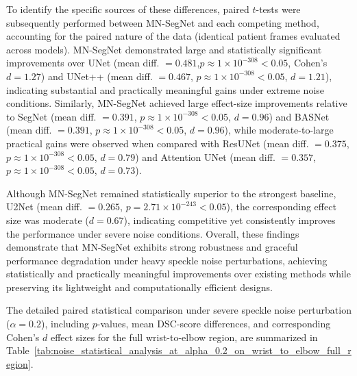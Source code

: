 \documentclass[12pt,letterpaper]{article}
\begin{document}
To identify the specific sources of these differences, paired $t$-tests were
subsequently performed between MN-SegNet and each competing method, accounting
for the paired nature of the data (identical patient frames evaluated across
models). MN-SegNet demonstrated large and statistically significant improvements
over UNet (mean diff. $= 0.481$,$p \approx 1 \times 10^{-308} < 0.05$, Cohen’s $d = 1.27$)
and UNet++ (mean diff. $= 0.467$, $p \approx 1 \times 10^{-308} < 0.05$, $d = 1.21$),
indicating substantial and practically meaningful gains under extreme noise
conditions. Similarly, MN-SegNet achieved large effect-size improvements relative
to SegNet (mean diff. $= 0.391$, $p \approx 1 \times 10^{-308} < 0.05$, $d = 0.96$) and
BASNet (mean diff. $= 0.391$, $p \approx 1 \times 10^{-308} < 0.05$, $d = 0.96$), while
moderate-to-large practical gains were observed when compared with ResUNet (mean diff. $= 0.375$, $p \approx 1 \times 10^{-308} < 0.05$, $d = 0.79$) and Attention UNet
(mean diff. $= 0.357$, $p \approx 1 \times 10^{-308} < 0.05$, $d = 0.73$).




Although MN-SegNet remained statistically superior to the strongest baseline,
U2Net (mean diff. $= 0.265$, $p = 2.71 \times 10^{-243}< 0.05$), the corresponding
effect size was moderate ($d = 0.67$), indicating competitive yet consistently
improves the performance under severe noise conditions. Overall, these findings
demonstrate that MN-SegNet exhibits strong robustness and graceful performance
degradation under heavy speckle noise perturbations, achieving statistically and
practically meaningful improvements over existing methods while preserving its
lightweight and computationally efficient designs.

The detailed paired statistical comparison under severe speckle noise
perturbation ($\alpha = 0.2$), including $p$-values, mean DSC-score differences,
and corresponding Cohen’s $d$ effect sizes for the full wrist-to-elbow region,
are summarized in
Table~\ref{tab:noise_statistical_analysis_at_alpha_0.2_on_wrist_to_elbow_full_region}.
 
\end{document}
